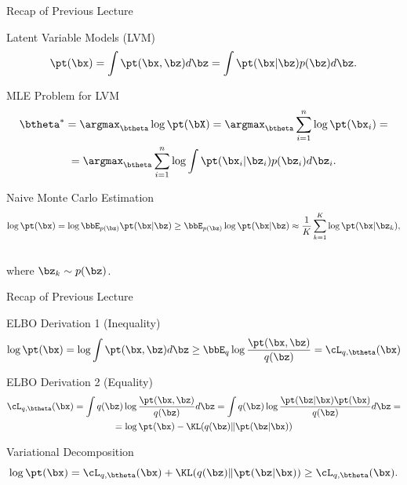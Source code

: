 \documentclass{beamer}
\begin{document}
\begin{frame}
	\titlepage
	\resetonslide
\end{frame}
\begin{frame}{Recap of Previous Lecture}
	\begin{block}{Latent Variable Models (LVM)}
		\vspace{-0.3cm}
		\[
			\pt(\bx) = \int \pt(\bx, \bz) d\bz = \int \pt(\bx | \bz) p(\bz) d\bz.
		\]
	\end{block}
	\begin{block}{MLE Problem for LVM}
		\vspace{-0.7cm}
		\begin{multline*}
			\btheta^* = \argmax_{\btheta} \log \pt(\bX) = \argmax_{\btheta} \sum_{i=1}^n \log \pt(\bx_i) = \\ = \argmax_{\btheta}  \sum_{i=1}^n \log \int \pt(\bx_i| \bz_i) p(\bz_i) d\bz_i.
		\end{multline*}
		\vspace{-0.7cm}
	\end{block}
	\begin{block}{Naive Monte Carlo Estimation}
		\vspace{-0.7cm}
		\[
			\log \pt(\bx) = \log \bbE_{p(\bz)} \pt(\bx | \bz) \geq \bbE_{p(\bz)} \log \pt(\bx | \bz) \approx \frac{1}{K} \sum_{k=1}^{K} \log \pt(\bx | \bz_k),
		\]
		\vspace{-0.5cm} \\
		where $\bz_k \sim p(\bz)$. 
	\end{block}
\end{frame}
\begin{frame}{Recap of Previous Lecture}
	\begin{block}{ELBO Derivation 1 (Inequality)}
		\[
			\log \pt(\bx) = \log \int \pt(\bx, \bz) d\bz \geq \bbE_{q} \log \frac{\pt(\bx, \bz)}{q(\bz)} = \cL_{q, \btheta}(\bx)
		\]
		\vspace{-0.3cm}
	\end{block}
	\begin{block}{ELBO Derivation 2 (Equality)}
		\vspace{-0.3cm}
		\begin{multline*}
			\cL_{q, \btheta}(\bx) = \int q(\bz) \log \frac{\pt(\bx, \bz)}{q(\bz)}d\bz = 
			\int q(\bz) \log \frac{\pt(\bz|\bx)\pt(\bx)}{q(\bz)}d\bz = \\
			= \log \pt(\bx) - \KL(q(\bz) \| \pt(\bz|\bx))
		\end{multline*}
	\end{block}
	\vspace{-0.3cm}
	\begin{block}{Variational Decomposition}
		\[
		\log \pt(\bx) = \cL_{q, \btheta}(\bx) + \KL(q(\bz) \| \pt(\bz|\bx)) \geq \cL_{q, \btheta}(\bx).
		\]
	\end{block}
\end{frame}
\end{document}
